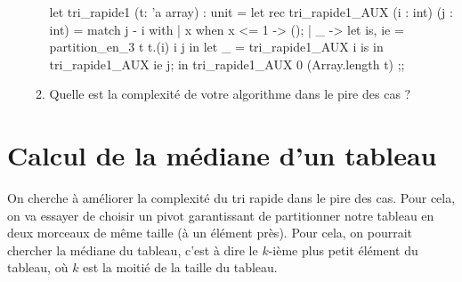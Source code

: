 \documentclass[a4paper,french,bookmarks]{article}
\begin{document}
\begin{enumerate}
\begin{enumerate}
        \begin{ocaml}
let tri_rapide1 (t: 'a array) : unit =
    let rec tri_rapide1_AUX (i : int) (j : int) = match j - i with
        | x when x <= 1 -> ();
        | _ -> let is, ie = partition_en_3 t t.(i) i j in
            let _ = tri_rapide1_AUX i is in tri_rapide1_AUX ie j;
    in tri_rapide1_AUX 0 (Array.length t)
;;
        \end{ocaml}
        
        \item\label{question1:3b} Quelle est la complexité de votre algorithme dans le pire des cas ?
        
    \end{enumerate}

\end{enumerate}

\section{Calcul de la médiane d’un tableau}\label{sec:2}

On cherche à améliorer la complexité du tri rapide dans le pire des cas. Pour cela, on va essayer de choisir un pivot garantissant de partitionner notre tableau en deux morceaux de même taille (à un élément près). Pour cela, on pourrait chercher la médiane du tableau, c’est à dire le $k$-ième plus petit élément du tableau, où $k$ est la moitié de la taille du tableau.
\end{document}
